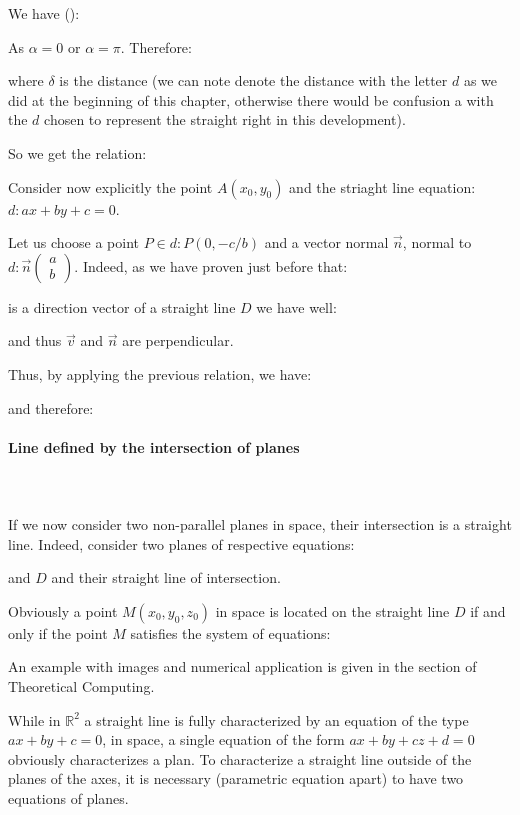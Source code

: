 	We have ():
	
	As $\alpha=0$ or $\alpha=\pi$. Therefore:
	
	where $\delta$ is the distance (we can note denote the distance with the letter $d$ as we did at the beginning of this chapter, otherwise there would be confusion a with the $d$ chosen to represent the straight right in this development).
	
	So we get the relation:
	
	Consider now explicitly the point $A(x_0,y_0)$ and the striaght line equation: $d:ax+by+c=0$.
	
	Let us choose a point $P\in d:P(0,-c/b)$ and a vector normal $\vec{n}$, normal to $d:\vec{n}\begin{pmatrix}a \\ b\end{pmatrix}$. Indeed, as we have proven just before that:
	
	is a direction vector of a straight line $D$ we have well:
	
	and thus $\vec{v}$ and $\vec{n}$ are perpendicular.
	
	Thus, by applying the previous relation, we have:
	
	and therefore:
	
	
	\paragraph{Line defined by the intersection of planes}\mbox{}\\\\
	If we now consider two non-parallel planes in space, their intersection is a straight line. Indeed, consider two planes of respective equations:
	
	and $D$ and their straight line of intersection.
	
	Obviously a point $M(x_0,y_0,z_0)$ in space is located on the straight line $D$ if and only if the point $M$ satisfies the system of equations:
	
	An example with images and numerical application is given in the section of Theoretical Computing.
	\begin{tcolorbox}[title=Remark,colframe=black,arc=10pt]
	While in $\mathbb{R}^2$ a straight line is fully characterized by an equation of the type $ax+by+c=0$, in space, a single equation of the form $ax+by+cz+d=0$ obviously characterizes a plan. To characterize a straight line outside of the planes of the axes, it is necessary (parametric equation apart) to have two equations of planes.
	\end{tcolorbox}	
	
